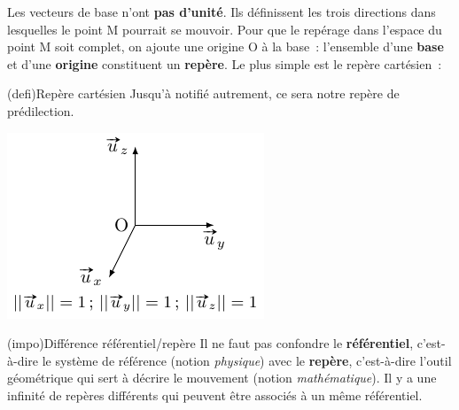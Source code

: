 \documentclass[../../main/main.tex]{subfiles}
\begin{document}
Les vecteurs de base n'ont \textbf{pas d'unité}. Ils définissent les trois
directions dans lesquelles le point M pourrait se mouvoir. Pour que le repérage
dans l'espace du point M soit complet, on ajoute une origine O à la base~:
l'ensemble d'une \textbf{base} et d'une \textbf{origine} constituent un
\textbf{repère}. Le plus simple est le repère cartésien~:
\begin{tcb*}[sidebyside, righthand ratio=.25](defi){Repère cartésien}
	\bigbreak
	Jusqu'à notifié autrement, ce sera notre repère de prédilection.
	\tcblower
	\begin{center}
		\includegraphics[width=\linewidth]{cart}
	\end{center}
\end{tcb*}

\begin{tcb*}[breakable](impo){Différence référentiel/repère}
	Il ne faut pas confondre le \textbf{référentiel}, c'est-à-dire le système de
	référence (notion \textit{physique}) avec le \textbf{repère}, c'est-à-dire
	l'outil géométrique qui sert à décrire le mouvement (notion
	\textit{mathématique}). Il y a une infinité de repères différents qui peuvent
	être associés à un même référentiel.
\end{tcb*}
\end{document}
